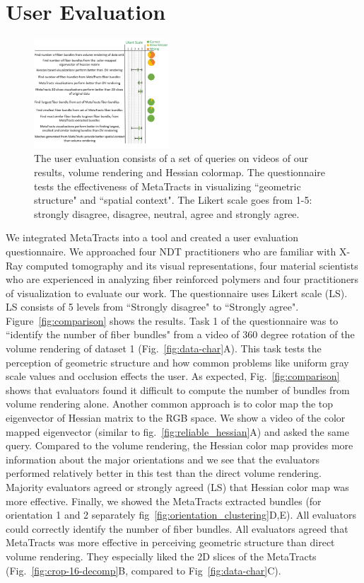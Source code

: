 \section {User Evaluation}
\label {sec:user_eval}
\begin{figure}
	\centering
	\includegraphics[width=0.45\textwidth,  trim = 0mm 60mm 0mm 0mm, clip]{images_pvis/usereval}
	\caption{The user evaluation consists of a set of queries on videos of our results, volume rendering and Hessian colormap. The questionnaire tests the effectiveness of MetaTracts in visualizing ``geometric structure" and ``spatial context". The Likert scale goes from 1-5: strongly disagree, disagree, neutral, agree and strongly agree. }
	\label{fig:userstudy}
\end{figure}
We integrated MetaTracts into a tool and created a user evaluation questionnaire. We approached four NDT practitioners who are familiar with X-Ray computed tomography and its visual representations, four material scientists who are experienced in analyzing fiber reinforced polymers and four practitioners of visualization to evaluate our work. The questionnaire uses Likert scale (LS). LS consists of 5 levels from ``Strongly disagree" to ``Strongly agree". Figure~\ref{fig:comparison} shows the results. Task 1 of the questionnaire was to ``identify the number of fiber bundles" from a video of 360 degree rotation of the volume rendering of dataset 1 (Fig.~\ref{fig:data-char}A). This task tests the perception of geometric structure and how common problems like uniform gray scale values and occlusion effects the user. As expected, Fig.~\ref{fig:comparison} shows that evaluators found it difficult to compute the number of bundles from volume rendering alone. Another common approach is to color map the top eigenvector of Hessian matrix to the RGB space. We show a video of the color mapped eigenvector (similar to fig.~\ref{fig:reliable_hessian}A) and asked the same query. Compared to the volume rendering, the Hessian color map provides more information about the major orientations and we see that the evaluators performed relatively better in this test than the direct volume rendering. Majority evaluators agreed or strongly agreed (LS) that Hessian color map was more effective. Finally, we showed the MetaTracts extracted bundles (for orientation 1 and 2 separately fig~\ref{fig:orientation_clustering}D,E). All evaluators could correctly identify the number of fiber bundles. All evaluators agreed that MetaTracts was more effective in perceiving geometric structure than direct volume rendering. They especially liked the 2D slices of the MetaTracts (Fig.~\ref{fig:crop-16-decomp}B, compared to Fig~\ref{fig:data-char}C).
